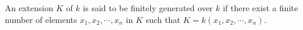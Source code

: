 An extension $K$ of $k$ is said to be finitely generated over $k$ if there exist a finite number of elements $x_1, x_2, \cdots, x_n$ in $K$ such that $K = k(x_1, x_2, \cdots, x_n)$.
